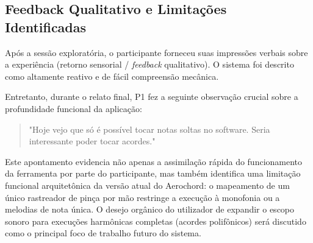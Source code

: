 \subsection{Feedback Qualitativo e Limitações Identificadas}
Após a sessão exploratória, o participante forneceu suas impressões verbais sobre a experiência (retorno sensorial / \textit{feedback} qualitativo). O sistema foi descrito como altamente reativo e de fácil compreensão mecânica.

Entretanto, durante o relato final, P1 fez a seguinte observação crucial sobre a profundidade funcional da aplicação:
\begin{quote}
"Hoje vejo que só é possível tocar notas soltas no software. Seria interessante poder tocar acordes."
\end{quote}

Este apontamento evidencia não apenas a assimilação rápida do funcionamento da ferramenta por parte do participante, mas também identifica uma limitação funcional arquitetônica da versão atual do Aerochord: o mapeamento de um único rastreador de pinça por mão restringe a execução à monofonia ou a melodias de nota única. O desejo orgânico do utilizador de expandir o escopo sonoro para execuções harmônicas completas (acordes polifônicos) será discutido como o principal foco de trabalho futuro do sistema.